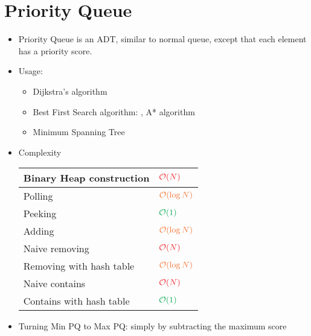 \section{Priority Queue}
\begin{itemize}
	\item Priority Queue is an \ac{ADT}, similar to normal queue, except that each element has a priority score.
	\item Usage:
	\begin{itemize}
		\item Dijkstra's algorithm
		\item Best First Search algorithm: \eg, A* algorithm
		\item Minimum Spanning Tree
	\end{itemize}
	\item Complexity
	\begin{center}
		\begin{tabular}{|l|l|}
			\hline
			Binary Heap construction & $ \color{Red} \mathcal{O}(N) $ \\ \hline
			Polling & $ \color{Orange} \mathcal{O}(\log N) $ \\ \hline
			Peeking & $ \color{Green} \mathcal{O}(1) $ \\ \hline
			Adding & $ \color{Orange} \mathcal{O}(\log N) $ \\ \hline
			Naive removing & $ \color{Red} \mathcal{O}(N) $ \\ \hline
			Removing with hash table & $ \color{Orange} \mathcal{O}(\log N) $ \\ \hline
			Naive contains & $ \color{Red} \mathcal{O}(N) $ \\ \hline
			Contains with hash table & $ \color{Green} \mathcal{O}(1) $ \\ \hline
		\end{tabular}
	\end{center}
	\item Turning Min PQ to Max PQ: simply by subtracting the maximum score
\end{itemize}

